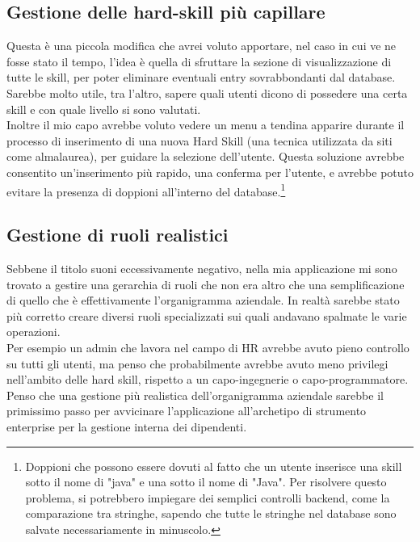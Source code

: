 \subsection{Gestione delle hard-skill più capillare}
Questa è una piccola modifica che avrei voluto apportare, nel caso in cui ve ne fosse stato il tempo, l'idea è quella di sfruttare la sezione di visualizzazione di tutte le skill, per poter eliminare eventuali entry sovrabbondanti dal database. Sarebbe molto utile, tra l'altro, sapere quali utenti dicono di possedere una certa skill e con quale livello si sono valutati.
\\
Inoltre il mio capo avrebbe voluto vedere un menu a tendina apparire durante il processo di inserimento di una nuova Hard Skill (una tecnica utilizzata da siti come almalaurea), per guidare la selezione dell'utente. Questa soluzione avrebbe consentito un'inserimento più rapido, una conferma per l'utente, e avrebbe potuto evitare la presenza di doppioni all'interno del database.\footnote{
Doppioni che possono essere dovuti al fatto che un utente inserisce una skill sotto il nome di "java" e una sotto il nome di "Java". Per risolvere questo problema, si potrebbero impiegare dei semplici controlli backend, come la comparazione tra stringhe, sapendo che tutte le stringhe nel database sono salvate necessariamente in minuscolo.
}

\subsection{Gestione di ruoli realistici}
Sebbene il titolo suoni eccessivamente negativo, nella mia applicazione mi sono trovato a gestire una gerarchia di ruoli che non era altro che una semplificazione di quello che è effettivamente l'organigramma aziendale. In realtà sarebbe stato più corretto creare diversi ruoli specializzati sui quali andavano spalmate le varie operazioni.
\\
Per esempio un admin che lavora nel campo di HR avrebbe avuto pieno controllo su tutti gli utenti, ma penso che probabilmente avrebbe avuto meno privilegi nell'ambito delle hard skill, rispetto a un capo-ingegnerie o capo-programmatore.
\\
Penso che una gestione più realistica dell'organigramma aziendale sarebbe il primissimo passo per avvicinare l'applicazione all'archetipo di strumento enterprise per la gestione interna dei dipendenti.


